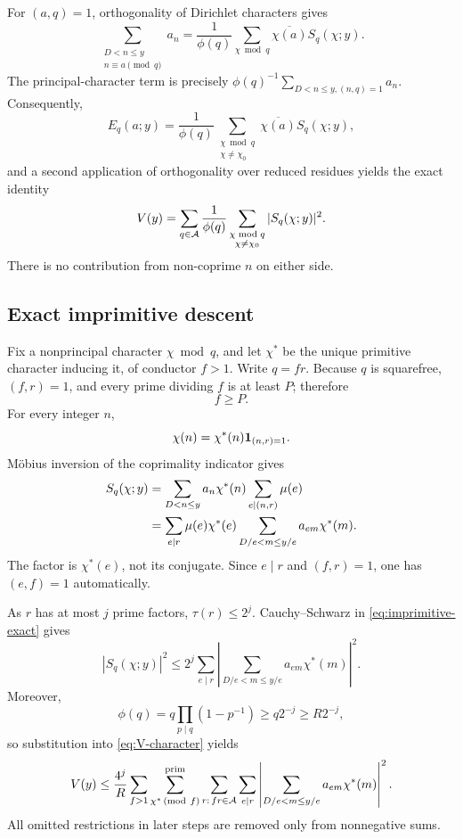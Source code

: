 For $(a,q)=1$, orthogonality of Dirichlet characters gives
\[
 \sum_{\substack{D<n\le y\\n\equiv a\pmod q}}a_n
 =\frac1{\phi(q)}\sum_{\chi\bmod q}\overline{\chi(a)}S_q(\chi;y).
\]
The principal-character term is precisely
$\phi(q)^{-1}\sum_{D<n\le y,(n,q)=1}a_n$.  Consequently,
\begin{equation}\label{eq:E-character}
 E_q(a;y)=\frac1{\phi(q)}
     \sum_{\substack{\chi\bmod q\\\chi\ne\chi_0}}
        \overline{\chi(a)}S_q(\chi;y),
\end{equation}
and a second application of orthogonality over reduced residues yields the
exact identity
\begin{equation}\label{eq:V-character}
 V(y)=\sum_{q\in\mathcal A}\frac1{\phi(q)}
       \sum_{\substack{\chi\bmod q\\\chi\ne\chi_0}}
         |S_q(\chi;y)|^2.
\end{equation}
There is no contribution from non-coprime $n$ on either side.

\subsection{Exact imprimitive descent}

Fix a nonprincipal character $\chi\bmod q$, and let $\chi^*$ be the unique
primitive character inducing it, of conductor $f>1$.  Write $q=fr$.  Because
$q$ is squarefree, $(f,r)=1$, and every prime dividing $f$ is at least $P$;
therefore
\begin{equation}\label{eq:f-lower}
                         f\ge P.
\end{equation}
For every integer $n$,
\[
              \chi(n)=\chi^*(n)\mathbf 1_{(n,r)=1}.
\]
M\"obius inversion of the coprimality indicator gives
\begin{align}
 S_q(\chi;y)
 &=\sum_{D<n\le y}a_n\chi^*(n)
          \sum_{e\mid(n,r)}\mu(e)\notag\\
 &=\sum_{e\mid r}\mu(e)\chi^*(e)
       \sum_{D/e<m\le y/e}a_{em}\chi^*(m).
       \label{eq:imprimitive-exact}
\end{align}
The factor is $\chi^*(e)$, not its conjugate.  Since $e\mid r$ and
$(f,r)=1$, one has $(e,f)=1$ automatically.

As $r$ has at most $j$ prime factors,
$\tau(r)\le2^j$.  Cauchy--Schwarz in \cref{eq:imprimitive-exact} gives
\begin{equation}\label{eq:imprimitive-cauchy}
 |S_q(\chi;y)|^2
 \le2^j\sum_{e\mid r}
       \left|\sum_{D/e<m\le y/e}a_{em}\chi^*(m)\right|^2.
\end{equation}
Moreover,
\begin{equation}\label{eq:phi-lower}
        \phi(q)=q\prod_{p\mid q}(1-p^{-1})\ge q2^{-j}\ge R2^{-j},
\end{equation}
so substitution into \cref{eq:V-character} yields
\begin{equation}\label{eq:V-preblock}
 V(y)\le\frac{4^j}{R}
 \sum_{f>1}\sum_{\chi^*\, (\mathrm{mod}\ f)}^{\mathrm{prim}}
 \sum_{\substack{r:\,fr\in\mathcal A}}
 \sum_{e\mid r}
 \left|\sum_{D/e<m\le y/e}a_{em}\chi^*(m)\right|^2.
\end{equation}
All omitted restrictions in later steps are removed only from nonnegative sums.

